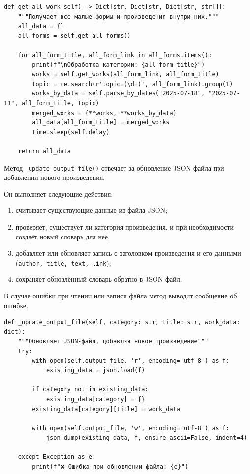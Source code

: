 \documentclass[coursework]{SCWorks}
\begin{document}
    \begin{verbatim}
def get_all_work(self) -> Dict[str, Dict[str, Dict[str, str]]]:
    """Получает все малые формы и произведения внутри них."""
    all_data = {}
    all_forms = self.get_all_forms()

    for all_form_title, all_form_link in all_forms.items():
        print(f"\nОбработка категории: {all_form_title}")
        works = self.get_works(all_form_link, all_form_title)
        topic = re.search(r'topic=(\d+)', all_form_link).group(1)
        works_by_data = self.parse_by_dates("2025-07-18", "2025-07-11", all_form_title, topic)
        merged_works = {**works, **works_by_data}
        all_data[all_form_title] = merged_works
        time.sleep(self.delay)

    return all_data
    \end{verbatim}

    Метод \texttt{\_update\_output\_file()} отвечает за обновление JSON-файла при добавлении нового произведения.

    Он выполняет следующие действия:
    \begin{enumerate}
        \item считывает существующие данные из файла JSON;
        \item проверяет, существует ли категория произведения, и при необходимости создаёт новый словарь для неё;
        \item добавляет или обновляет запись с заголовком произведения и его данными (\texttt{author, title, text, link});
        \item сохраняет обновлённый словарь обратно в JSON-файл.
    \end{enumerate}

    В случае ошибки при чтении или записи файла метод выводит сообщение об ошибке.

    \begin{verbatim}
def _update_output_file(self, category: str, title: str, work_data: dict):
    """Обновляет JSON-файл, добавляя новое произведение"""
    try:
        with open(self.output_file, 'r', encoding='utf-8') as f:
            existing_data = json.load(f)

        if category not in existing_data:
            existing_data[category] = {}
        existing_data[category][title] = work_data

        with open(self.output_file, 'w', encoding='utf-8') as f:
            json.dump(existing_data, f, ensure_ascii=False, indent=4)

    except Exception as e:
        print(f"❌ Ошибка при обновлении файла: {e}")
    \end{verbatim}
\end{document}
